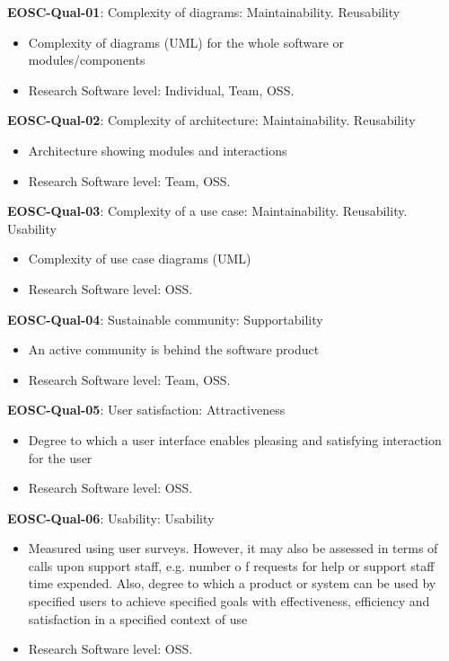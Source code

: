 \textbf{EOSC-Qual-01}: Complexity of diagrams: Maintainability. Reusability

\begin{itemize}
    \item Complexity of diagrams (UML) for the whole software or modules/components~\cite{montagud_systematic_2012}
    \item Research Software level: Individual, Team, OSS.
\end{itemize}

\textbf{EOSC-Qual-02}: Complexity of architecture: Maintainability. Reusability

\begin{itemize}
    \item Architecture showing modules and interactions~\cite{montagud_systematic_2012,zuser_software_2005}
    \item Research Software level: Team, OSS.
\end{itemize}

\textbf{EOSC-Qual-03}: Complexity of a use case: Maintainability. Reusability. Usability

\begin{itemize}
    \item Complexity of use case diagrams (UML)~\cite{montagud_systematic_2012}
    \item Research Software level: OSS.
\end{itemize}

\textbf{EOSC-Qual-04}: Sustainable community: Supportability

\begin{itemize}
    \item An active community is behind the software product~\cite{aberdour_achieving_2007}
    \item Research Software level: Team, OSS.
\end{itemize}

\textbf{EOSC-Qual-05}: User satisfaction: Attractiveness

\begin{itemize}
    \item Degree to which a user interface enables pleasing and satisfying interaction for the user~\cite{iso_25010_2011_2017,zuser_software_2005}
    \item Research Software level: OSS.
\end{itemize}

\textbf{EOSC-Qual-06}: Usability: Usability

\begin{itemize}
    \item Measured using user surveys. However, it may also be assessed in terms of calls upon support staff, e.g. number o f requests for help or support staff time expended. Also, degree to which a product or system can be used by specified users to achieve specified goals with
effectiveness, efficiency and satisfaction in a specified context of use~\cite{iso_25010_2011_2017,zuser_software_2005,gillies_modelling_1992,boehm_quantitative_1976}
    \item Research Software level: OSS.
\end{itemize}

